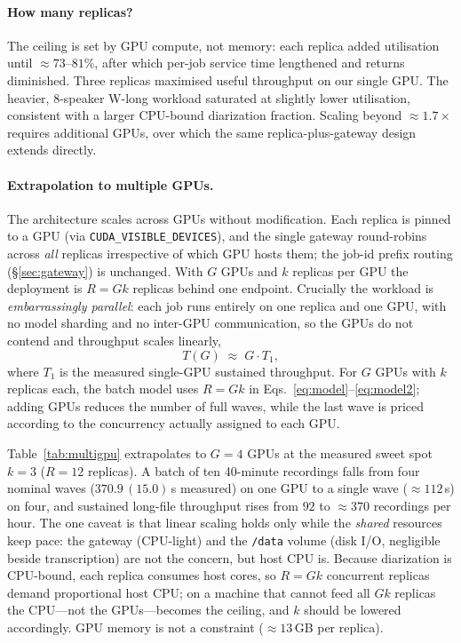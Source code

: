 \documentclass[10pt]{article}
\newcommand{\msd}[2]{$#1\,(#2)$}
\begin{document}
\paragraph{How many replicas?} The ceiling is set by GPU compute, not memory:
each replica added utilisation until $\approx 73$--$81\%$, after which per-job
service time lengthened and returns diminished. Three replicas maximised useful
throughput on our single GPU. The heavier, 8-speaker W-long workload saturated at
slightly lower utilisation, consistent with a larger CPU-bound diarization
fraction. Scaling beyond $\approx 1.7\times$ requires additional GPUs, over which
the same replica-plus-gateway design extends directly.

\paragraph{Extrapolation to multiple GPUs.}
The architecture scales across GPUs without modification. Each replica is pinned
to a GPU (via \texttt{CUDA\_VISIBLE\_DEVICES}), and the single gateway
round-robins across \emph{all} replicas irrespective of which GPU hosts them; the
job-id prefix routing (\S\ref{sec:gateway}) is unchanged. With $G$ GPUs and $k$
replicas per GPU the deployment is $R=Gk$ replicas behind one endpoint. Crucially
the workload is \emph{embarrassingly parallel}: each job runs entirely on one
replica and one GPU, with no model sharding and no inter-GPU communication, so
the GPUs do not contend and throughput scales linearly,
\begin{equation}
  T(G) \;\approx\; G \cdot T_1,
  \label{eq:gpuscale}
\end{equation}
where $T_1$ is the measured single-GPU sustained throughput. For $G$ GPUs with
$k$ replicas each, the batch model uses $R=Gk$ in
Eqs.~\eqref{eq:model}--\eqref{eq:model2}; adding GPUs reduces the number of full
waves, while the last wave is priced according to the concurrency actually
assigned to each GPU.

Table~\ref{tab:multigpu} extrapolates to $G=4$ GPUs at the measured sweet spot
$k=3$ ($R=12$ replicas). A batch of ten 40-minute recordings falls from four
nominal waves (\msd{370.9}{15.0}\,s measured) on one GPU to a single wave
($\approx 112$\,s) on four, and sustained long-file throughput rises from $92$
to $\approx 370$ recordings per
hour. The one caveat is that linear scaling holds only while the \emph{shared}
resources keep pace: the gateway (CPU-light) and the \texttt{/data} volume
(disk I/O, negligible beside transcription) are not the concern, but host CPU is.
Because diarization is CPU-bound, each replica consumes host cores, so $R=Gk$
concurrent replicas demand proportional host CPU; on a machine that cannot feed
all $Gk$ replicas the CPU---not the GPUs---becomes the ceiling, and $k$ should be
lowered accordingly. GPU memory is not a constraint ($\approx 13$\,GB per
replica).
\end{document}
